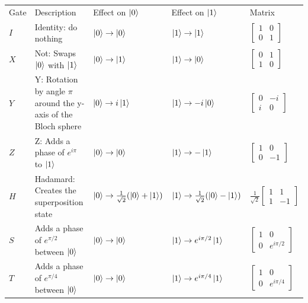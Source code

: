 \documentclass{book}
\begin{document}
\begin{center}
\begin{tabular}{||m{1cm}| m{5cm} | m{3cm} | m{3cm} | m{2cm}||} 
 
 Gate & Description & Effect on $\ket{0}$ & Effect on $\ket{1}$ & Matrix \\ [0.5ex] 
 
 $I$ & Identity: do nothing & $\ket{0} \rightarrow  \ket{0} $ & $\ket{1} \rightarrow \ket{1}$ & $\begin{bmatrix} 1 & 0 \\ 0 & 1 \end{bmatrix}$ \\ 
 
 $X$ & Not: Swaps $\ket{0}$ with $\ket{1}$   &$\ket{0} \rightarrow \ket{1}$ &$\ket{1} \rightarrow  \ket{0}$ & $\begin{bmatrix} 0 & 1 \\ 1 & 0 \end{bmatrix}$ \\
 
 $Y$ & Y: Rotation by angle $\pi$ around the y-axis of the Bloch sphere & $\ket{0} \rightarrow  i\ket{1} $ & $\ket{1} \rightarrow -i\ket{0} $ & $\begin{bmatrix} 0 & -i \\ i & 0 \end{bmatrix}$ \\
 
 $Z$ & Z: Adds a phase of $e^{i\pi}$ to $\ket{1}$&$\ket{0} \rightarrow \ket{0}$&$\ket{1} \rightarrow -\ket{1}$ &$\begin{bmatrix} 1 & 0 \\ 0 & -1 \end{bmatrix}$  \\
 
 $H$ & Hadamard: Creates the superposition state & $\ket{0} \rightarrow \frac{1}{\sqrt{2}} ( \ket{0} + \ket{1})$ & $\ket{1} \rightarrow \frac{1}{\sqrt{2}} ( \ket{0} - \ket{1})$ & $\frac{1}{\sqrt{2}}\begin{bmatrix} 1 & 1 \\ 1 & -1 \end{bmatrix} $\\
 
 $S$ & Adds a phase of $e^{\pi/2}$ between $\ket{0}$ &$\ket{0} \rightarrow  \ket{0} $ &$\ket{1} \rightarrow e^{i\pi/2}\ket{1}$  & $\begin{bmatrix} 1 & 0 \\ 0 & e^{i\pi/2} \end{bmatrix}$\\
 
 $T$ & Adds a phase of $e^{\pi/4}$ between $\ket{0}$ &  $\ket{0} \rightarrow  \ket{0} $& $\ket{1} \rightarrow e^{i\pi/4}\ket{1}$ & $\begin{bmatrix} 1 & 0 \\ 0 & e^{i\pi/4} \end{bmatrix}$\\ [1ex] 
 
\end{tabular}
\end{center}
\end{document}
